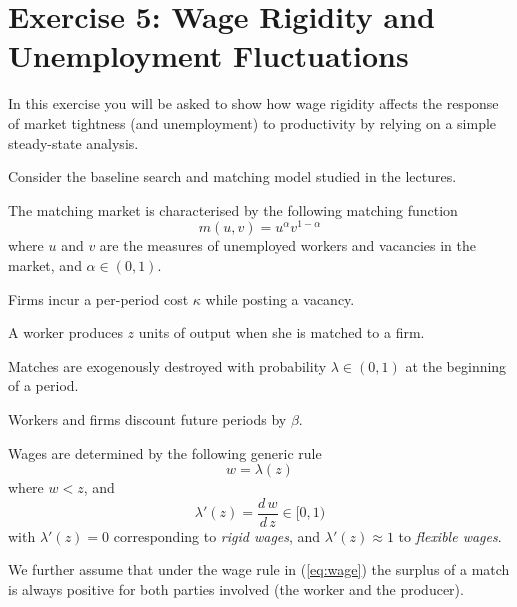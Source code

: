 \documentclass[a4paper,11pt]{article}
\begin{document}

%


\bigskip

\section*{Exercise 5: Wage Rigidity and Unemployment Fluctuations}
In this exercise you will be asked to show how wage rigidity affects the response of market tightness (and unemployment) to productivity by relying on a simple steady-state analysis.

\medskip

Consider the baseline search and matching model studied in the lectures. 

\medskip

The matching market is characterised by the following matching function
$$ m(u,v) = u^\alpha v^{1-\alpha} $$
where $u$ and $v$ are the measures of unemployed workers and vacancies in the market, and $\alpha\in(0,1)$.

\medskip

Firms incur a per-period cost $\kappa$ while posting a vacancy.

\medskip

A worker produces $z$ units of output when she is matched to a firm.

\medskip

Matches are exogenously destroyed with probability $\lambda\in(0,1)$ at the beginning of a period.

\medskip

Workers and firms discount future periods by $\beta$.

\medskip

Wages are determined by the following generic rule
\begin{equation}\label{eq:wage}
    w = \lambda(z)
\end{equation}
where $w<z$, and $$ \lambda'(z)=\frac{d\,w}{d\,z}\in[0,1)$$
with $\lambda'(z)=0$ corresponding to \textit{rigid wages}, and $\lambda'(z)\approx1$ to \textit{flexible wages}. 

\medskip

We further assume that under the wage rule in (\ref{eq:wage}) the surplus of a match is always positive for both parties involved (the worker and the producer).
\end{document}
